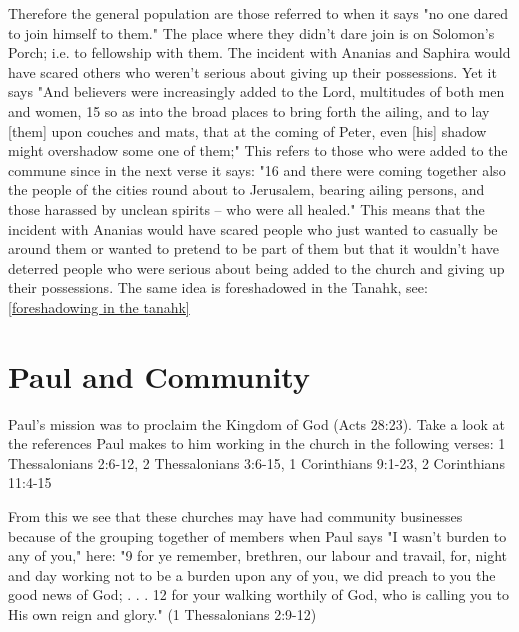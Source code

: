 \documentclass[11pt]{article}
\begin{document}
Therefore the general population are those referred to when it says "no one dared to join himself to them." The place where they didn't dare join is on Solomon's Porch; i.e. to fellowship with them. The incident with Ananias and Saphira would have scared others who weren't serious about giving up their possessions. Yet it says "And believers were increasingly added to the Lord, multitudes of both men and women, 15 so as into the broad places to bring forth the ailing, and to lay [them] upon couches and mats, that at the coming of Peter, even [his] shadow might overshadow some one of them;" This refers to those who were added to the commune since in the next verse it says: "16 and there were coming together also the people of the cities round about to Jerusalem, bearing ailing persons, and those harassed by unclean spirits -- who were all healed." This means that the incident with Ananias would have scared people who just wanted to casually be around them or wanted to pretend to be part of them but that it wouldn't have deterred people who were serious about being added to the church and giving up their possessions. The same idea is foreshadowed in the Tanahk, see: \ref{foreshadowing in the tanahk}

\section{Paul and Community}

Paul's mission was to proclaim the Kingdom of God (Acts 28:23). Take a look at the references Paul makes to him working in the church in the following verses: 1 Thessalonians 2:6-12, 2 Thessalonians 3:6-15, 1 Corinthians 9:1-23, 2 Corinthians 11:4-15

From this we see that these churches may have had community businesses because of the grouping together of members when Paul says "I wasn't burden to any of you," here: "9 for ye remember, brethren, our labour and travail, for, night and day working not to be a burden upon any of you, we did preach to you the good news of God; . . . 12 for your walking worthily of God, who is calling you to His own reign and glory." (1 Thessalonians 2:9-12) 
\end{document}
